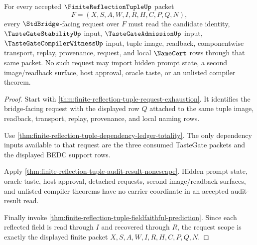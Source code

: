 \begin{theorem}
\label{thm:finite-reflection-tuple-stdbridge-request-scope}
For every accepted $\FiniteReflectionTupleUp$ packet
$$
F=(X,S,A,W,I,R,H,C,P,Q,N),
$$
every $\StdBridge$-facing request over $F$ must read the candidate identity, $\TasteGateStabilityUp$ input, $\TasteGateAdmissionUp$ input, $\TasteGateCompilerWitnessUp$ input, tuple image, readback, componentwise transport, replay, provenance, request, and local $\NameCert$ rows through that same packet. No such request may import hidden prompt state, a second image/readback surface, host approval, oracle taste, or an unlisted compiler theorem.
\end{theorem}
\begin{proof}
Start with \autoref{thm:finite-reflection-tuple-request-exhaustion}. It identifies the bridge-facing request with the displayed row $Q$ attached to the same tuple image, readback, transport, replay, provenance, and local naming rows.

Use \autoref{thm:finite-reflection-tuple-dependency-ledger-totality}. The only dependency inputs available to that request are the three consumed TasteGate packets and the displayed BEDC support rows.

Apply \autoref{thm:finite-reflection-tuple-audit-result-nonescape}. Hidden prompt state, oracle taste, host approval, detached requests, second image/readback surfaces, and unlisted compiler theorems have no carrier coordinate in an accepted audit-result read.

Finally invoke \autoref{thm:finite-reflection-tuple-fieldfaithful-prediction}. Since each reflected field is read through $I$ and recovered through $R$, the request scope is exactly the displayed finite packet $X,S,A,W,I,R,H,C,P,Q,N$.
\end{proof}

